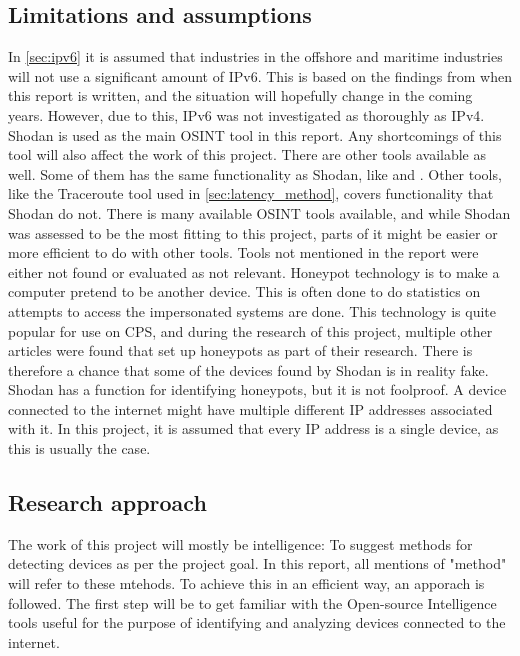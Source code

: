\subsection{Limitations and assumptions} \label{sec:limits}
In \cref{sec:ipv6} it is assumed that industries in the offshore and maritime industries will not use a significant amount of IPv6. This is based on the findings from when this report is written, and the situation will hopefully change in the coming years. However, due to this, IPv6 was not investigated as thoroughly as IPv4.
Shodan is used as the main OSINT tool in this report. Any shortcomings of this tool will also affect the work of this project.
There are other tools available as well. Some of them has the same functionality as Shodan, like \href{https://censys.io/}{\color{blue}{Censys}}\cite{censys} and \href{www.zoomeye.org}{\color{blue}{ZoomEye}}\cite{zoomeye}. Other tools, like the Traceroute tool used in \cref{sec:latency_method}, covers functionality that Shodan do not. There is many available OSINT tools available, and while Shodan was assessed to be the most fitting to this project, parts of it might be easier or more efficient to do with other tools. Tools not mentioned in the report were either not found or evaluated as not relevant.
Honeypot technology is to make a computer pretend to be another device. This is often done to do statistics on attempts to access the impersonated systems are done. This technology is quite popular for use on CPS, and during the research of this project, multiple other articles were found that set up honeypots as part of their research.\cite{bodenheim_butts_dunlap_mullins_2014}\cite{ICS_shodan_article} There is therefore a chance that some of the devices found by Shodan is in reality fake. Shodan has a function for identifying honeypots, but it is not foolproof.
A device connected to the internet might have multiple different IP addresses associated with it. In this project, it is assumed that every IP address is a single device, as this is usually the case.


\subsection{Research approach} \label{sec:research_approach}
The work of this project will mostly be intelligence: To suggest methods for detecting devices as per the project goal. In this report, all mentions of "method" will refer to these mtehods.
To achieve this in an efficient way, an apporach is followed.
The first step will be to get familiar with the Open-source Intelligence tools useful for the purpose of identifying and analyzing devices connected to the internet. 

